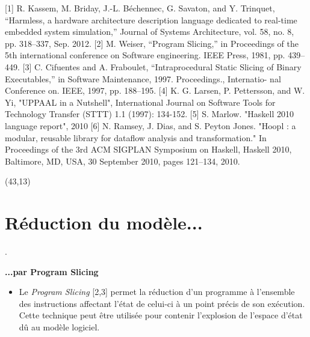 \documentclass[final]{beamer}
\begin{document}
\begin{frame}
\begin{textblock}{39}
      {\footnotesize
        [1] R. Kassem, M. Briday, J.-L. Béchennec, G. Savaton, and Y. Trinquet,
        “Harmless, a hardware architecture description language dedicated to
        real-time embedded system simulation,” Journal of Systems Architecture,
        vol. 58, no. 8, pp. 318–337, Sep. 2012.  [2] M. Weiser, “Program
        Slicing,” in Proceedings of the 5th international conference on Software
        engineering. IEEE Press, 1981, pp. 439–449.  [3] C. Cifuentes and
        A. Fraboulet, “Intraprocedural Static Slicing of Binary Executables,” in
        Software Maintenance, 1997. Proceedings., Internatio- nal Conference
        on. IEEE, 1997, pp. 188–195.  [4] K. G. Larsen, P. Pettersson, and
        W. Yi, "UPPAAL in a Nutshell", International Journal on Software Tools
        for Technology Transfer (STTT) 1.1 (1997): 134-152.  [5]
        S. Marlow. "Haskell 2010 language report", 2010 [6] N. Ramsey, J. Dias,
        and S. Peyton Jones. "Hoopl : a modular, reusable library for dataflow
        analysis and transformation."  In Proceedings of the 3rd ACM SIGPLAN
        Symposium on Haskell, Haskell 2010, Baltimore, MD, USA, 30 September
        2010, pages 121–134, 2010.
      }
      
    \end{textblock}

    
    \begin{textblock}{39}(43,13)
      \section{Réduction du modèle...}
      \begin{block}{\thesection. \secname}

        \textbf{...par Program Slicing}
        \begin{itemize}
          \item[] Le \textit{Program Slicing} [2,3] permet la réduction d'un programme
            à l'ensemble des instructions affectant l'état de celui-ci à un
            point précis de son exécution. Cette technique peut être utilisée
            pour contenir l'explosion de l'espace d'état dû au modèle logiciel.
            \vspace{.5em}
            

\end{itemize}
\end{block}
\end{textblock}
\end{frame}
\end{document}
